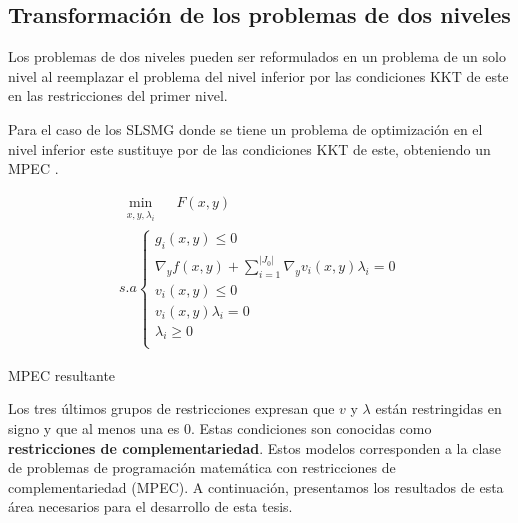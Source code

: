 \subsection{Transformación de los problemas de dos niveles}
		
		Los problemas de dos niveles pueden ser reformulados en un problema de un solo nivel al reemplazar el problema del nivel inferior por las condiciones KKT de este en las restricciones del primer nivel. 
		
		Para el caso de los SLSMG donde se tiene un problema de optimización en el nivel inferior este sustituye por de las condiciones KKT de este, obteniendo un MPEC \autocite{aussel2020}.
        
       \begin{table}[H]
        \centering
        \begin{equation}
            \begin{array}{l}
                \underset{\substack{x, y, \lambda_i}}{\min} \quad F(x, y)\\
                s.a \left\{ 
                \begin{array}{l}
                    g_i(x, y) \leq 0\\
                    \nabla_{y} f(x, y) + \sum_{i=1}^{|J_{0}|} \nabla_{y} v_i(x, y) \lambda_i = 0 \\
                    v_i(x, y) \leq 0 \\
                    v_i(x, y)\lambda_i = 0 \\
                    \lambda_i \geq 0\\
                \end{array}\right.
                \tag{\theequation}
            \end{array}
            \label{eq:KKT_Optimista}
        \end{equation}
        \caption*{MPEC resultante}
        
    \end{table}
    
Los tres últimos grupos de restricciones expresan que $v$ y $\lambda$ están restringidas en signo y que al menos una es 0. Estas condiciones son conocidas como \textbf{restricciones de complementariedad}. Estos modelos corresponden a la clase de problemas de programación matemática con restricciones de complementariedad (MPEC). A continuación, presentamos los resultados de esta área necesarios para el desarrollo de esta tesis.


